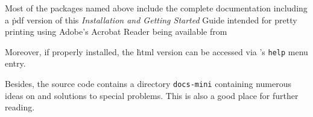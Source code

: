 Most of the packages named above include the complete \FlightGear{} documentation
including a \.pdf version of this \textit{Installation and Getting Started} Guide intended
for pretty printing using Adobe's Acrobat Reader being available from
 \medskip

 \medskip

 \noindent
 Moreover, if properly installed, the \.html version can be accessed via
\FlightGear{}'s \texttt{help} menu entry.

Besides, the source code contains a directory \texttt{docs-mini} containing numerous
ideas on and solutions to special problems. This is also a good place for further
reading.

